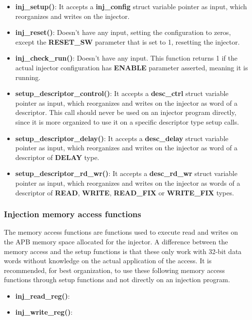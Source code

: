 \begin{itemize}
  \item \textbf{inj\_setup()}: It accepts a \textbf{inj\_config} struct variable pointer as input, which reorganizes and writes on the injector.
  \item \textbf{inj\_reset()}: Doesn't have any input, setting the configuration to zeros, except the \textbf{RESET\_SW} parameter that is set to 1, resetting the injector.
  \item \textbf{inj\_check\_run()}: Doesn't have any input. This function returns 1 if the actual injector configuration has \textbf{ENABLE} parameter asserted, meaning it is running.
  \item \textbf{setup\_descriptor\_control()}: It accepts a \textbf{desc\_ctrl} struct variable pointer as input, which reorganizes and writes on the injector as word of a descriptor. This call should never be used on an injector program directly, since it is more organized to use it on a specific descriptor type setup calls.
  \item \textbf{setup\_descriptor\_delay()}: It accepts a \textbf{desc\_delay} struct variable pointer as input, which reorganizes and writes on the injector as word of a descriptor of \textbf{DELAY} type.
  \item \textbf{setup\_descriptor\_rd\_wr()}: It accepts a \textbf{desc\_rd\_wr} struct variable pointer as input, which reorganizes and writes on the injector as words of a descriptor of \textbf{READ}, \textbf{WRITE}, \textbf{READ\_FIX} or \textbf{WRITE\_FIX} types.
\end{itemize}
\vspace{15px}


\subsubsection{Injection memory access functions}
\label{software-drivers-memfunc}

The memory access functions are functions used to execute read and writes on the APB memory space allocated for the injector.
A difference between the memory access and the setup functions is that these only work with 32-bit data words without knowledge on the actual application of the 
access.
It is recommended, for best organization, to use these following memory access functions through setup functions and not directly on an injection program.

\begin{itemize}
  \item \textbf{inj\_read\_reg()}:
  \item \textbf{inj\_write\_reg()}:
\end{itemize}
\vspace{15px}

